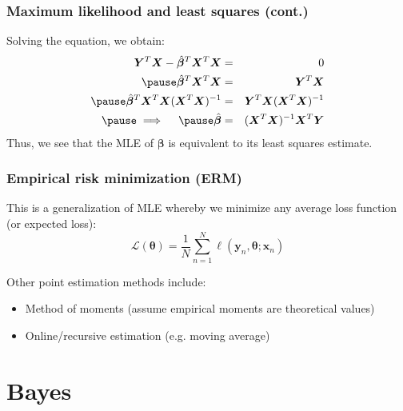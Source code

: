 \documentclass[smaller]{beamer}
\newcommand{\?}{\stackrel{?}{=}}
\newcommand{\fr}{\frac}
\begin{document}
\begin{frame}
  \frametitle{Maximum likelihood and least squares (cont.)}
  Solving the equation, we obtain:\pause
  \begin{eqnarray}
       \bm Y^T\bm X - \hat{\bm\beta}^T\bm{X}^T\bm{X}  &=& 0 \\ \pause
      \hat{\bm\beta}^T\bm X^T\bm X &=& \bm{Y}^T\bm{X}  \\\pause
      \hat{\bm\beta}^T\bm X^T\bm X (\bm X^T \bm X)^{-1}&=& \bm{Y}^T\bm{X}(\bm X^T \bm X)^{-1}  \\\pause
      \implies\quad \pause \hat{\bm \beta} &=& (\bm X^T \bm X)^{-1}\bm X^T \bm Y
   \end{eqnarray}
  \pause
  Thus, we see that the MLE of $\bm\beta$ is equivalent to its least squares estimate.

\end{frame}


\begin{frame}
  \frametitle{Empirical risk minimization (ERM)}
  \pause
  This is a generalization of MLE whereby we minimize any average loss function (or expected loss):
  \pause
  \begin{equation}
    \mathcal{L}(\bm\theta) = \fr1N\sum_{n=1}^N\ell(\bm y_n, \bm\theta; \bm x_n)
  \end{equation}

  \pause

  Other point estimation methods include:\pause
  \begin{itemize}
  \item Method of moments (assume empirical moments are theoretical values)\pause
    \item Online/recursive estimation (e.g. moving average)
  \end{itemize}
\end{frame}

\section{Bayes}
\end{document}
